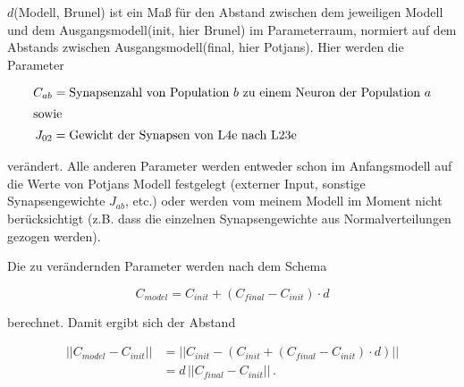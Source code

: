 \documentclass[paper=a4, fontsize=12pt, xcolor=dvipsnames]{scrartcl} %
\begin{document}
$d$(Modell, Brunel) ist ein Maß für den Abstand zwischen dem jeweiligen Modell
und dem Ausgangsmodell(init, hier Brunel) im Parameterraum, normiert auf dem Abstands zwischen 
Ausgangsmodell(final, hier Potjans). Hier werden die Parameter 


\begin{align}
    C_{ab} &= \text{Synapsenzahl von Population $b$ zu einem Neuron der Population $a$} \nonumber \\
    \intertext{sowie} 
    J_{02} &= \text{Gewicht der Synapsen von L4e nach L23e} \nonumber
\end{align}

verändert. Alle anderen Parameter werden entweder schon im Anfangsmodell auf die 
Werte von Potjans Modell festgelegt (externer Input, sonstige Synapsengewichte $J_{ab}$, etc.)
oder werden vom meinem Modell im Moment nicht berücksichtigt (z.B. dass die einzelnen Synapsengewichte
aus Normalverteilungen gezogen werden). 

Die zu verändernden Parameter werden nach dem Schema

\begin{equation}
    C_{model} = C_{init} + (C_{final} - C_{init}) \cdot d
\end{equation}

berechnet. Damit ergibt sich der Abstand

\begin{equation}
    \begin{split}
    ||C_{model} - C_{init} || 
        &= || C_{init} - \left(C_{init} + (C_{final} - C_{init}) \cdot d\right) || \\
        &= d \, || C_{final} - C_{init} || \, .
    \end{split}
\end{equation}
\end{document}

